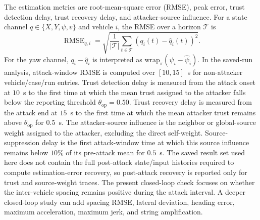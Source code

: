 \documentclass[journal,twoside]{IEEEtran}
\begin{document}
The estimation metrics are root-mean-square error (RMSE), peak error, trust detection delay, trust recovery delay, and attacker-source influence. For a state channel $q\in\{X,Y,\psi,v\}$ and vehicle $i$, the RMSE over a horizon $\mathcal{T}$ is
\begin{equation}
\operatorname{RMSE}_{q,i}=
\sqrt{\frac{1}{|\mathcal{T}|}\sum_{t\in\mathcal{T}}
\left(q_i(t)-\hat q_i(t)\right)^2}.
\end{equation}
For the yaw channel, $q_i-\hat q_i$ is interpreted as $\mathrm{wrap}_{\pi}(\psi_i-\hat\psi_i)$. 
In the saved-run analysis, attack-window RMSE is computed over $[10,15]$~s for non-attacker vehicle/case/run entries. Trust detection delay is measured from the attack onset at $10$~s to the first time at which the mean trust assigned to the attacker falls below the reporting threshold $\theta_{\mathrm{op}}=0.50$. 
Trust recovery delay is measured from the attack end at $15$~s to the first time at which the mean attacker trust remains above $\theta_{\mathrm{op}}$ for $0.5$~s. The attacker-source influence is the neighbor or global-source weight assigned to the attacker, excluding the direct self-weight. Source-suppression delay is the first attack-window time at which this source influence remains below $10\%$ of its pre-attack mean for $0.5$~s. The saved result set used here does not contain the full post-attack state/input histories required to compute estimation-error recovery, so post-attack recovery is reported only for trust and source-weight traces. The present closed-loop check focuses on whether the inter-vehicle spacing remains positive during the attack interval. A deeper closed-loop study can add spacing RMSE, lateral deviation, heading error, maximum acceleration, maximum jerk, and string amplification.
\end{document}
